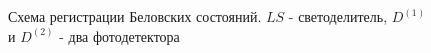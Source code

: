 \begin{figure}
\centering


\caption{Схема регистрации Беловских состояний. $LS$ - светоделитель,
  $D^{(1)}$ и $D^{(2)}$ - два фотодетектора}
\label{figBellReg}
\end{figure}
